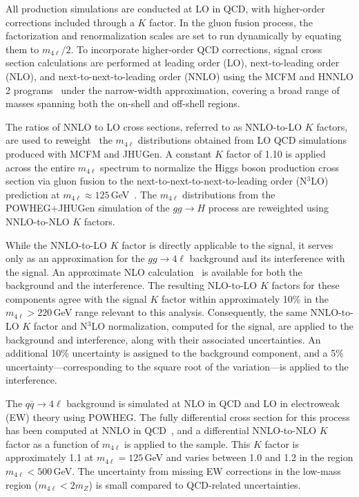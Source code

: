 
All \offshell production simulations are conducted at LO in QCD, with higher-order corrections 
included through a $K$ factor. In the gluon fusion process, the factorization and renormalization scales are set to run dynamically by equating them to $m_{4\ell}/2$. To incorporate higher-order QCD corrections, signal cross section calculations are performed at leading order (LO), next-to-leading order (NLO), and next-to-next-to-leading order (NNLO) using the MCFM and HNNLO 2 programs~\cite{Catani:2007vq,Grazzini:2008tf,Grazzini:2013mca} under the narrow-width approximation, covering a broad range of masses spanning both the on-shell and off-shell regions.

The ratios of NNLO to LO cross sections, referred to as NNLO-to-LO $K$ factors, are used to reweight~\cite{deFlorian:2016spz} the $m_{4\ell}$ distributions obtained from LO QCD simulations produced with MCFM and JHUGen. A constant $K$ factor of 1.10 is applied across the entire $m_{4\ell}$ spectrum to normalize the Higgs boson production cross section via gluon fusion to the next-to-next-to-next-to-leading order (N$^3$LO) prediction at $m_{4\ell} \approx 125$\,GeV~\cite{deFlorian:2016spz}. The $m_{4\ell}$ distributions from the POWHEG+JHUGen simulation of the $gg \to H$ process are reweighted using NNLO-to-NLO $K$ factors.

While the NNLO-to-LO $K$ factor is directly applicable to the signal, it serves only as an approximation for the $gg \to 4\ell$ background and its interference with the signal. An approximate NLO calculation~\cite{Caola:2015psa,Melnikov:2015laa,Campbell:2016ivq,Caola:2016trd} is available for both the background and the interference. The resulting NLO-to-LO $K$ factors for these components agree with the signal $K$ factor within approximately 10\% in the $m_{4\ell} > 220$\,GeV range relevant to this analysis. Consequently, the same NNLO-to-LO $K$ factor and N$^3$LO normalization, computed for the signal, are applied to the background and interference, along with their associated uncertainties. An additional 10\% uncertainty is assigned to the background component, and a 5\% uncertainty—corresponding to the square root of the variation—is applied to the interference.

The $q\bar{q} \to 4\ell$ background is simulated at NLO in QCD and LO in electroweak (EW) theory using POWHEG. The fully differential cross section for this process has been computed at NNLO in QCD~\cite{Grazzini:2015hta}, and a differential NNLO-to-NLO $K$ factor as a function of $m_{4\ell}$ is applied to the \POWHEG sample. This $K$ factor is approximately 1.1 at $m_{4\ell} = 125$\,GeV and varies between 1.0 and 1.2 in the region $m_{4\ell} < 500$\,GeV. The uncertainty from missing EW corrections in the low-mass region ($m_{4\ell} < 2m_{Z}$) is small compared to QCD-related uncertainties.

